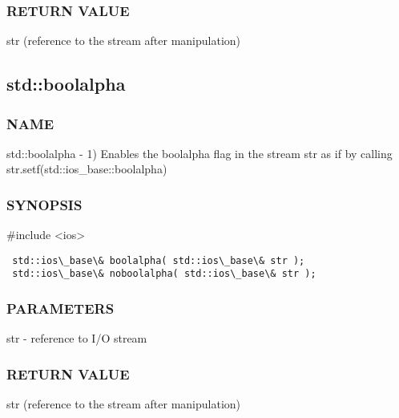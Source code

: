 \subsubsection{RETURN VALUE}
str (reference to the stream after manipulation)



\subsection{std::boolalpha}

\subsubsection{NAME}
std::boolalpha - 1) Enables the boolalpha flag in the stream str as if by calling str.setf(std::ios\_base::boolalpha)

\subsubsection{SYNOPSIS}
\#include <ios>

\begin{lstlisting}
 std::ios\_base\& boolalpha( std::ios\_base\& str );
 std::ios\_base\& noboolalpha( std::ios\_base\& str );
\end{lstlisting}

\subsubsection{PARAMETERS}
str - reference to I/O stream

\subsubsection{RETURN VALUE}
str (reference to the stream after manipulation)



